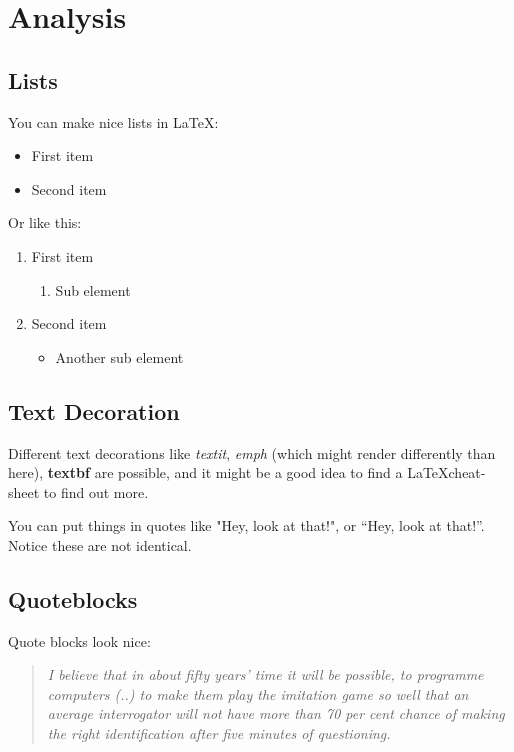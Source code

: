 \documentclass[a4paper, twocolumn]{article}
\begin{document}
\section{Analysis}


\subsection{Lists}
\label{sec:Lists}

You can make nice lists in \LaTeX:

\begin{itemize}
    \item First item
    \item Second item
\end{itemize}

Or like this:

\begin{enumerate}
    \item First item
        \begin{enumerate}
            \item Sub element
        \end{enumerate}
    \item Second item
        \begin{itemize}
            \item Another sub element
        \end{itemize}
\end{enumerate}


\subsection{Text Decoration\label{sec:Text Decoration}}


Different text decorations like \textit{textit}, \emph{emph} (which might render differently than here), \textbf{textbf} are possible, and it might be a good idea to find a \LaTeX cheat-sheet to find out more.

You can put things in quotes like "Hey, look at that!", or ``Hey, look at that!''.
Notice these are not identical.


\subsection{Quoteblocks\label{sec:Quoteblock}}

Quote blocks look nice:

\begin{quote}
\emph{
I believe that in about fifty years' time it will be possible, to programme computers (..) to make them play the imitation game so well that an average interrogator will not have more than 70 per cent chance of making the right identification after five minutes of questioning.
}
\cite{turing1950computing}
\end{quote}
\end{document}
